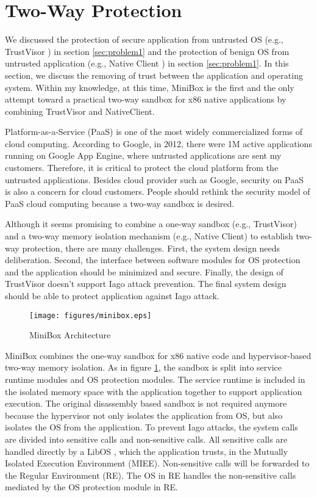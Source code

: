 \section{Two-Way Protection}
\label{sec:problem3}

We discussed the protection of secure application from untrusted OS (e.g.,
TrustVisor \cite{TrustVisor}) in section \ref{sec:problem1} and the protection
of benign OS from untrusted application (e.g., Native Client \cite{NaCl}) in
section \ref{sec:problem1}. In this section, we discuss the removing of trust
between the application and operating system. Within my knowledge, at this time,
MiniBox \cite{MiniBox} is the first and the only attempt toward a practical
two-way sandbox for x86 native applications by combining TrustVisor and
NativeClient.

Platform-as-a-Service (PaaS) is one of the most widely commercialized forms of
cloud computing. According to Google, in 2012, there were 1M active applications
running on Google App Engine, where untrusted applications are sent my
customers. Therefore, it is critical to protect the cloud platform from the
untrusted applications. Besides cloud provider such as Google, security on PaaS
is also a concern for cloud customers. People should rethink the security model
of PaaS cloud computing because a two-way sandbox is desired.

Although it seems promising to combine a one-way sandbox (e.g., TrustVisor) and
a two-way memory isolation mechanism (e.g., Native Client) to establish two-way
protection, there are many challenges. First, the system design needs
deliberation. Second, the interface between software modules for OS protection
and the application should be minimized and secure. Finally, the design of
TrustVisor doesn't support Iago attack prevention. The final system design
should be able to protect application against Iago attack.

\begin{figure}[htb]
\centering
\texttt{[image: figures/minibox.eps]}
\caption{MiniBox Architecture}
\label{fig:minibox}
\end{figure}

MiniBox \cite{MiniBox} combines the one-way sandbox for x86 native code and
hypervisor-based two-way memory isolation. As in figure \ref{fig:minibox}, the
sandbox is split into service runtime modules and OS protection modules. The
service runtime is included in the isolated memory space with the application
together to support application execution. The original disassembly based
sandbox is not required anymore because the hypervisor not only isolates the
application from OS, but also isolates the OS from the application. To prevent
Iago attacks, the system calls are divided into sensitive calls and
non-sensitive calls. All sensitive calls are handled directly by a LibOS
\cite{LibOS}, which the application trusts, in the Mutually Isolated Execution
Environment (MIEE).  Non-sensitive calls will be forwarded to the Regular
Environment (RE). The OS in RE handles the non-sensitive calls mediated by the
OS protection module in RE.

